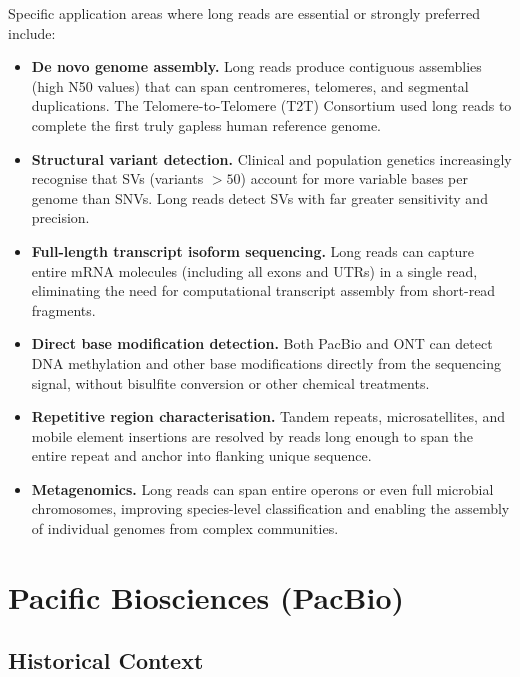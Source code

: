 Specific application areas where long reads are essential or strongly preferred include:

\begin{itemize}
  \item \textbf{De novo genome assembly.} Long reads produce contiguous assemblies (high N50 values) that can span centromeres, telomeres, and segmental duplications. The Telomere-to-Telomere (T2T) Consortium used long reads to complete the first truly gapless human reference genome.

  \item \textbf{Structural variant detection.} Clinical and population genetics increasingly recognise that \glspl{SV} (variants $>50$\basepair) account for more variable bases per genome than \glspl{SNV}. Long reads detect SVs with far greater sensitivity and precision.

  \item \textbf{Full-length transcript isoform sequencing.} Long reads can capture entire mRNA molecules (including all exons and UTRs) in a single read, eliminating the need for computational transcript assembly from short-read fragments.

  \item \textbf{Direct base modification detection.} Both PacBio and ONT can detect DNA methylation and other base modifications directly from the sequencing signal, without bisulfite conversion or other chemical treatments.

  \item \textbf{Repetitive region characterisation.} Tandem repeats, microsatellites, and mobile element insertions are resolved by reads long enough to span the entire repeat and anchor into flanking unique sequence.

  \item \textbf{Metagenomics.} Long reads can span entire operons or even full microbial chromosomes, improving species-level classification and enabling the assembly of individual genomes from complex communities.
\end{itemize}


\section{Pacific Biosciences (PacBio)}
\label{sec:pacbio}

\subsection{Historical Context}

